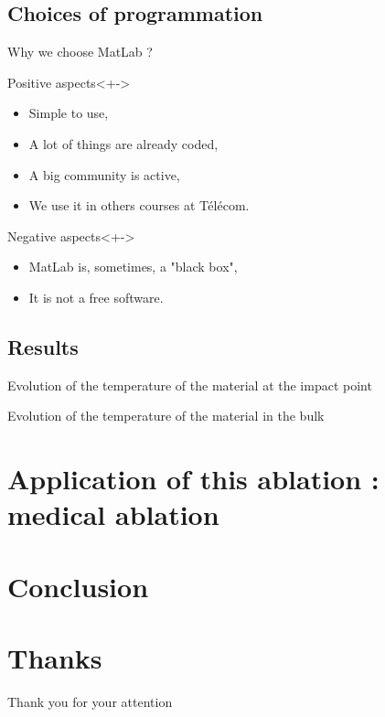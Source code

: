\documentclass[11pt]{beamer}
\begin{document}
\subsection{Choices of programmation}
\begin{frame}{Why we choose MatLab ?}
\begin{block}{Positive aspects}<+->
\begin{itemize}
\item<+-> Simple to use,
\item<+-> A lot of things are already coded,
\item<+-> A big community is active,
\item<+-> We use it in others courses at Télécom.
\end{itemize}
\end{block}

\begin{block}{Negative aspects}<+->
\begin{itemize}
\item<+-> MatLab is, sometimes, a "black box",
\item<+-> It is not a free software.
\end{itemize}
\end{block}
\end{frame}


\subsection{Results}
\begin{frame}{Evolution of the temperature of the material at the impact point}

\end{frame}

\begin{frame}{Evolution of the temperature of the material in the bulk}

\end{frame}

\section{Application of this ablation : medical ablation}
\begin{frame}

\end{frame}

\section{Conclusion}

\begin{frame}

\end{frame}

\section*{Thanks}
\begin{frame}
\center
\huge{Thank you for your attention}
\end{frame}
\end{document}
